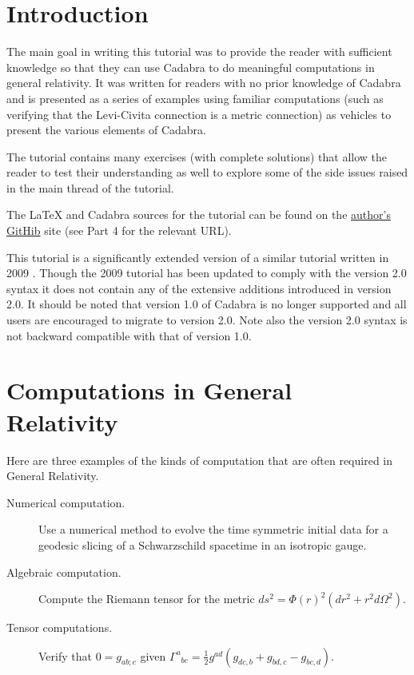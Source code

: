 \documentclass[a4paper,12pt]{article}
\numberwithin{equation}{section}%
\begin{document}
\section*{Introduction}
\label{sec:intro}

The main goal in writing this tutorial was to provide the reader with sufficient knowledge
so that they can use Cadabra \cite{peeters:2017-01,peeters:2017-02} to do meaningful
computations in general relativity. It was written for readers with no prior knowledge of
Cadabra and is presented as a series of examples using familiar computations (such as
verifying that the Levi-Civita connection is a metric connection) as vehicles to present the
various elements of Cadabra.

The tutorial contains many exercises (with complete solutions) that allow the reader to test
their understanding as well to explore some of the side issues raised in the main thread of
the tutorial.

The LaTeX and Cadabra sources for the tutorial can be found on the
\href{https://github.com/leo-brewin/cadabra-tutorial}{author's GitHib} site
(see Part 4 for the relevant URL).

This tutorial is a significantly extended version of a similar tutorial written in 2009
\cite{brewin:2009-02}. Though the 2009 tutorial has been updated to comply with the
version 2.0 syntax it does not contain any of the extensive additions introduced in version
2.0. It should be noted that version 1.0 of Cadabra is no longer supported and all users are
encouraged to migrate to version 2.0. Note also the version 2.0 syntax is not backward
compatible with that of version 1.0.

\clearpage

\section*{Computations in General Relativity}

Here are three examples of the kinds of computation that are often required in General
Relativity.

\begin{description}
\item[Numerical computation.]\hfil\break\vskip-15pt
Use a numerical method to evolve the time symmetric initial data for a geodesic slicing of a
Schwarzschild spacetime in an isotropic gauge.

\item[Algebraic computation.]\hfil\break\vskip-15pt
Compute the Riemann tensor for the metric $ds^2=\Phi(r)^2\left(dr^2+r^2d\Omega^2\right)$.

\item[Tensor computations.]\hfil\break\vskip-15pt
Verify that $0=g_{ab;c}$ given
$\Gamma^{a}{}_{bc} = \frac{1}{2}g^{ad}\left(g_{dc,b} + g_{bd,c} - g_{bc,d}\right)$.
\end{description}
\end{document}
